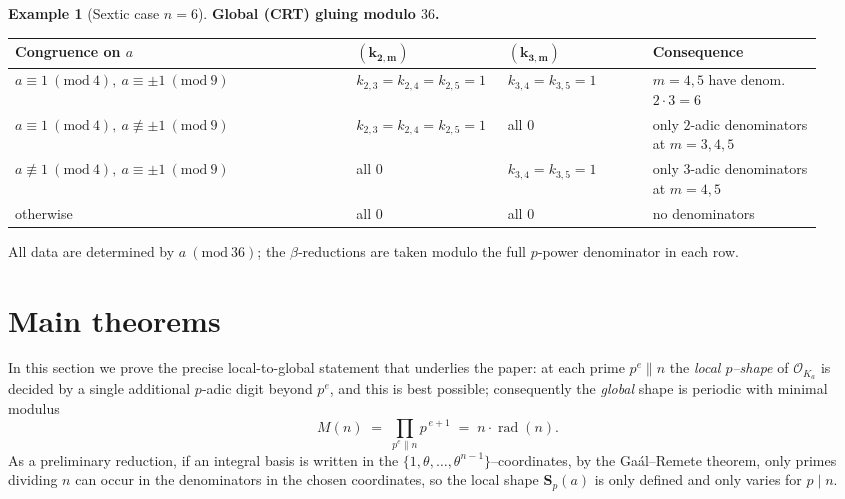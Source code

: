 \documentclass[12pt,a4paper,oneside]{amsart}
\theoremstyle{definition}
\newtheorem{example}[theorem]{Example}
\DeclareMathOperator{\rad}{rad}
\begin{document}
\begin{example}[Sextic case $n=6$]
\medskip
\noindent\textbf{Global (CRT) gluing modulo \(36\).}
\begin{center}
\small
\setlength{\tabcolsep}{4pt}
\renewcommand{\arraystretch}{1.15}
\begin{tabular}{@{}p{0.40\linewidth} p{0.17\linewidth} p{0.17\linewidth} p{0.20\linewidth}@{}}
\hline
\textbf{Congruence on \(a\)} & \(\mathbf{(k_{2,m})}\) & \(\mathbf{(k_{3,m})}\) & \textbf{Consequence}\\
\hline
\(a\equiv 1\ (\mathrm{mod}\ 4),\ a\equiv \pm1\ (\mathrm{mod}\ 9)\)
&
\(k_{2,3}=k_{2,4}=k_{2,5}=1\)
&
\(k_{3,4}=k_{3,5}=1\)
&
\(m=4,5\) have denom.\ \(2\cdot 3=6\)\\[2pt]
\(a\equiv 1\ (\mathrm{mod}\ 4),\ a\not\equiv \pm1\ (\mathrm{mod}\ 9)\)
&
\(k_{2,3}=k_{2,4}=k_{2,5}=1\)
&
all \(0\)
&
only \(2\)-adic denominators at \(m=3,4,5\)\\[2pt]
\(a\not\equiv 1\ (\mathrm{mod}\ 4),\ a\equiv \pm1\ (\mathrm{mod}\ 9)\)
&
all \(0\)
&
\(k_{3,4}=k_{3,5}=1\)
&
only \(3\)-adic denominators at \(m=4,5\)\\[2pt]
otherwise
&
all \(0\)
&
all \(0\)
&
no denominators\\
\hline
\end{tabular}
\end{center}

All data are determined by $a\ (\mathrm{mod}\ 36)$; the $\beta$‑reductions are taken modulo the full $p$‑power denominator in each row.
\end{example}





\section{Main theorems}\label{sec:proof}
In this section we prove the precise local-to-global statement that underlies the paper: at each prime $p^e\parallel n$ the \emph{local $p$–shape} of $\mathcal O_{K_a}$ is decided by a single additional $p$‑adic digit beyond $p^e$, and this is best possible; consequently the \emph{global} shape is periodic with minimal modulus
\[
M(n)\;=\;\prod_{p^e\parallel n}p^{\,e+1}\;=\;n\cdot\rad(n).
\]
As a preliminary reduction, if an integral basis is written in the $\{1,\theta,\dots,\theta^{n-1}\}$–coordinates, by the Ga\'al--Remete theorem, only primes dividing $n$ can occur in the denominators in the chosen coordinates, so the local shape $\mathbf S_p(a)$ is only defined and only varies for $p\mid n$. 
\end{document}
